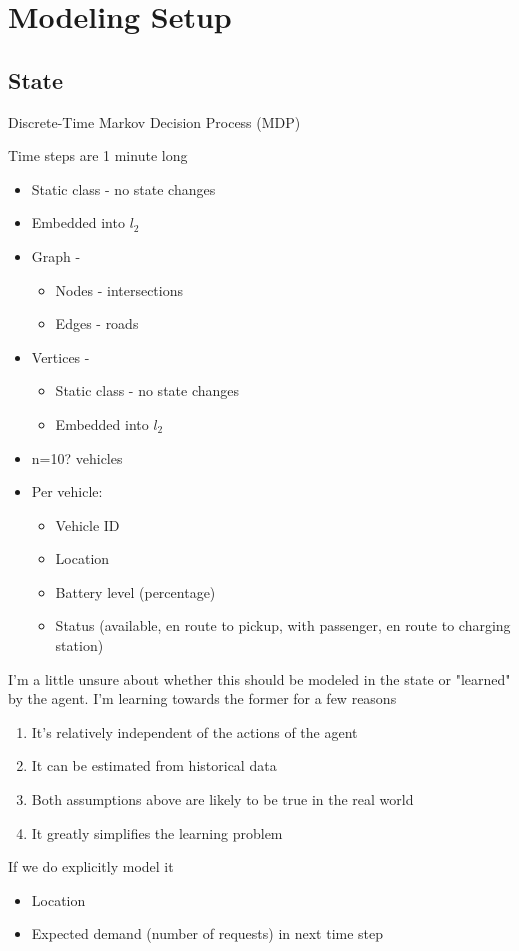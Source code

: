 \documentclass[12pt]{article}
\begin{document}
\psetheader %

\section*{Modeling Setup}
\subsection*{State}
Discrete-Time Markov Decision Process (MDP)

Time steps are 1 minute long

\begin{itemize}
		\item Static class - no state changes
		\item Embedded into $l_2$
		\item Graph -
				\begin{itemize}
						\item Nodes - intersections
						\item Edges - roads
				\end{itemize}
		\item Vertices -
				\begin{itemize}
						\item Static class - no state changes
						\item Embedded into $l_2$
				\end{itemize}
\end{itemize}
\begin{itemize}
		\item n=10? vehicles
		\item Per vehicle:
    \begin{itemize}
						\item Vehicle ID
						\item Location
						\item Battery level (percentage)
						\item Status (available, en route to pickup, with passenger, en route to charging station)
    \end{itemize}
\end{itemize}

\medskip
{}
I'm a little unsure about whether this should be  modeled in the state or
"learned" by the
agent. I'm learning towards the former for a few reasons
\begin{enumerate}
		\item It's relatively independent of the actions of the agent
		\item It can be estimated from historical data
		\item Both assumptions above are likely to be true in the real world
		\item It greatly simplifies the learning problem
\end{enumerate}
If we do explicitly model it
\begin{itemize}
		\item Location
		\item Expected demand (number of requests) in next time step
\end{itemize}
\end{document}
